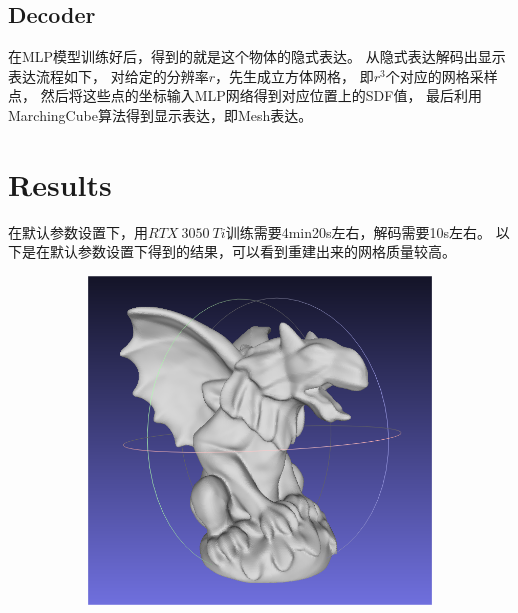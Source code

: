 \documentclass{ctexart}
\begin{document}
\subsection{Decoder}
在MLP模型训练好后，得到的就是这个物体的隐式表达。
从隐式表达解码出显示表达流程如下，
对给定的分辨率$r$，先生成立方体网格，
即$r^3$个对应的网格采样点，
然后将这些点的坐标输入MLP网络得到对应位置上的SDF值，
最后利用MarchingCube算法得到显示表达，即Mesh表达。
$$$$



\section{Results}
在默认参数设置下，用$RTX\ 3050\ Ti$训练需要4min20s左右，解码需要10s左右。
以下是在默认参数设置下得到的结果，可以看到重建出来的网格质量较高。
\begin{figure}[htbp]
    \centering
    \begin{subfigure}[htbp]{0.24\linewidth}
        \centering
        \includegraphics[width=0.9\linewidth]{figures/1.png}
    \end{subfigure}
    \begin{subfigure}[htbp]{0.24\linewidth}
        \centering

\end{subfigure}
\end{figure}
\end{document}
